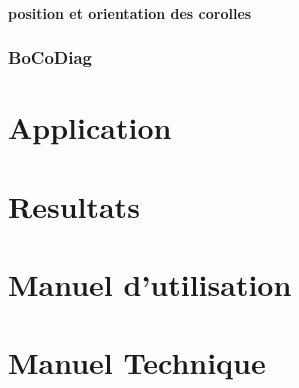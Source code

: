 \documentclass{article}
\begin{document}
	\paragraph{position et orientation des corolles}

	\subsubsection{BoCoDiag}
	
	\section{Application}
	
	\section{Resultats}
	
	\section{Manuel d'utilisation}
	
	\section{Manuel Technique}


	
	
	
\end{document}
